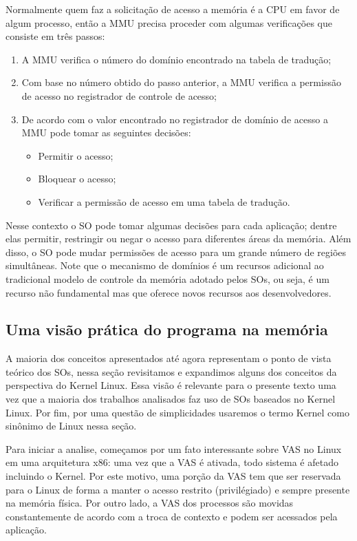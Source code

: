 Normalmente quem faz a solicitação de acesso a memória é a CPU em favor de
algum processo, então a MMU precisa proceder com algumas verificações que
consiste em três passos:

\begin{enumerate}
  \item A MMU verifica o número do domínio encontrado na tabela de tradução;
  \item Com base no número obtido do passo anterior, a MMU verifica a permissão
        de acesso no registrador de controle de acesso;
  \item De acordo com o valor encontrado no registrador de domínio de acesso a
        MMU pode tomar as seguintes decisões:
  \begin{itemize}
    \item Permitir o acesso;
    \item Bloquear o acesso;
    \item Verificar a permissão de acesso em uma tabela de tradução.
  \end{itemize}
\end{enumerate}

Nesse contexto o SO pode tomar algumas decisões para cada aplicação; dentre
elas permitir, restringir ou negar o acesso para diferentes áreas da memória.
Além disso, o SO pode mudar permissões de acesso para um grande número de
regiões simultâneas. Note que o mecanismo de domínios é um recursos adicional
ao tradicional modelo de controle da memória adotado pelos SOs, ou seja, é
um recurso não fundamental mas que oferece novos recursos aos desenvolvedores.

\subsection{Uma visão prática do programa na memória}

A maioria dos conceitos apresentados até agora representam o ponto de vista
teórico dos SOs, nessa seção revisitamos e expandimos alguns dos conceitos da
perspectiva do Kernel Linux. Essa visão é relevante para o presente texto uma
vez que a maioria dos trabalhos analisados faz uso de SOs baseados no Kernel
Linux. Por fim, por uma questão de simplicidades usaremos o termo Kernel como
sinônimo de Linux nessa seção.

Para iniciar a analise, começamos por um fato interessante sobre VAS no Linux
em uma arquitetura x86: uma vez que a VAS é ativada, todo sistema é afetado
incluindo o Kernel. Por este motivo, uma porção da VAS tem que ser reservada
para o Linux de forma a manter o acesso restrito (privilégiado) e sempre
presente na memória física. Por outro lado, a VAS dos processos são movidas
constantemente de acordo com a troca de contexto e podem ser acessados pela
aplicação.

